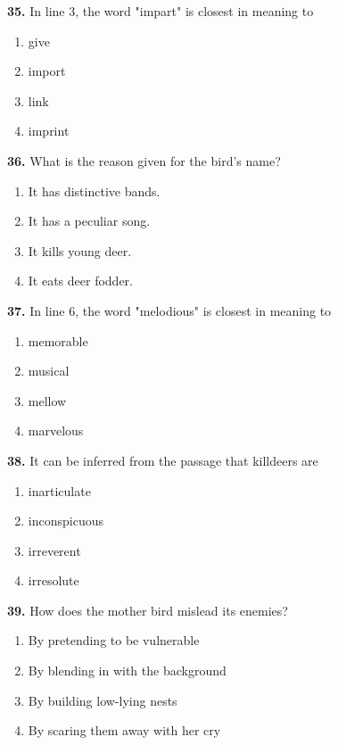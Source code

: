 \documentclass[12pt]{article}
\begin{document}
\par
\vspace{0.25\baselineskip}
\noindent\textbf{35.} In line 3, the word "impart" is closest in meaning to
\begin{enumerate}[label=(\Alph*),leftmargin=*,itemsep=0.2em]
\item give
\item import
\item link
\item imprint
\end{enumerate}
\par
\vspace{0.25\baselineskip}
\noindent\textbf{36.} What is the reason given for the bird's name?
\begin{enumerate}[label=(\Alph*),leftmargin=*,itemsep=0.2em]
\item It has distinctive bands.
\item It has a peculiar song.
\item It kills young deer.
\item It eats deer fodder.
\end{enumerate}
\par
\vspace{0.25\baselineskip}
\noindent\textbf{37.} In line 6, the word "melodious" is closest in meaning to
\begin{enumerate}[label=(\Alph*),leftmargin=*,itemsep=0.2em]
\item memorable
\item musical
\item mellow
\item marvelous
\end{enumerate}
\par
\vspace{0.25\baselineskip}
\noindent\textbf{38.} It can be inferred from the passage that killdeers are
\begin{enumerate}[label=(\Alph*),leftmargin=*,itemsep=0.2em]
\item inarticulate
\item inconspicuous
\item irreverent
\item irresolute
\end{enumerate}
\par
\vspace{0.25\baselineskip}
\noindent\textbf{39.} How does the mother bird mislead its enemies?
\begin{enumerate}[label=(\Alph*),leftmargin=*,itemsep=0.2em]
\item By pretending to be vulnerable
\item By blending in with the background
\item By building low-lying nests
\item By scaring them away with her cry
\end{enumerate}
\end{document}
